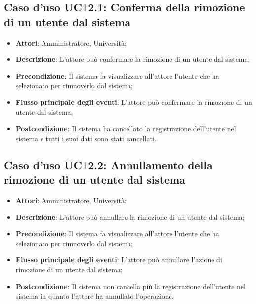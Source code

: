 \subsection{Caso d'uso \texorpdfstring{UC12.1}{UC12.1}: Conferma della rimozione di un utente dal sistema}
\begin{itemize}
\item \textbf{Attori}: Amministratore, Università;
\item \textbf{Descrizione}: L'attore può confermare la rimozione di un utente dal sistema;
\item \textbf{Precondizione}: Il sistema fa visualizzare all'attore l'utente che ha selezionato per rimuoverlo dal sistema;
\item \textbf{Flusso principale degli eventi}: L'attore può confermare la rimozione di un utente dal sistema;
\item \textbf{Postcondizione}: Il sistema ha cancellato la registrazione dell'utente nel sistema e tutti i suoi dati sono stati cancellati.
\end{itemize}
\subsection{Caso d'uso \texorpdfstring{UC12.2}{UC12.2}: Annullamento della rimozione di un utente dal sistema}
\begin{itemize}
\item \textbf{Attori}: Amministratore, Università;
\item \textbf{Descrizione}: L'attore può annullare la rimozione di un utente dal sistema;
\item \textbf{Precondizione}: Il sistema fa visualizzare all'attore l'utente che ha selezionato per rimuoverlo dal sistema;

\item \textbf{Flusso principale degli eventi}: L'attore può annullare l'azione di rimozione di un utente dal sistema;
\item \textbf{Postcondizione}: Il sistema non cancella più la registrazione dell'utente nel sistema in quanto l'attore ha annullato l'operazione.

\end{itemize}
